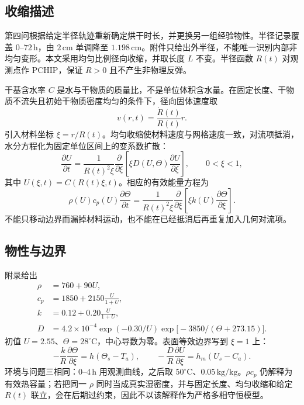 \subsection{收缩描述}

第四问根据给定半径轨迹重新确定烘干时长，并更换另一组经验物性。半径记录覆盖 $0$--$72\,\mathrm{h}$，由 $2\,\mathrm{cm}$ 单调降至 $1.198\,\mathrm{cm}$。附件只给出外半径，不能唯一识别内部非均匀变形。本文采用均匀比例径向收缩，并取长度 $L$ 不变。半径函数 $R(t)$ 对观测点作 PCHIP，保证 $R>0$ 且不产生非物理反弹。

干基含水率 $C$ 是水与干物质的质量比，不是单位体积含水量。在固定长度、干物质不流失且初始干物质密度均匀的条件下，径向固体速度取
\[
v(r,t)=\frac{\dot R(t)}{R(t)}r.
\]
引入材料坐标 $\xi=r/R(t)$。均匀收缩使材料速度与网格速度一致，对流项抵消，水分方程化为固定单位区间上的变系数扩散：
\begin{equation}
\frac{\partial U}{\partial t}
=\frac{1}{R(t)^2\xi}\frac{\partial}{\partial\xi}
\left[\xi D(U,\Theta)\frac{\partial U}{\partial\xi}\right],
\qquad 0<\xi<1,
\label{eq:q4-C}
\end{equation}
其中 $U(\xi,t)=C(R(t)\xi,t)$。相应的有效能量方程为
\begin{equation}
\rho(U)c_p(U)\frac{\partial\Theta}{\partial t}
=\frac{1}{R(t)^2\xi}\frac{\partial}{\partial\xi}
\left[\xi k(U)\frac{\partial\Theta}{\partial\xi}\right].
\label{eq:q4-T}
\end{equation}
不能只移动边界而漏掉材料运动，也不能在已经抵消后再重复加入几何对流项\cite{adrover2019}。

\subsection{物性与边界}

附录给出
\begin{equation}
\begin{aligned}
\rho&=760+90U,\\
c_p&=1850+2150\frac{U}{1+U},\\
k&=0.12+0.20\frac{U}{1+U},\\
D&=4.2\times10^{-4}\exp(-0.30/U)\exp\bigl[-3850/(\Theta+273.15)\bigr].
\end{aligned}
\label{eq:q4-prop}
\end{equation}
初值 $U=2.55$、$\Theta=28^\circ\mathrm{C}$，中心导数为零。表面等效边界写到 $\xi=1$ 上：
\[
-\frac{k}{R}\frac{\partial\Theta}{\partial\xi}=h(\Theta_s-T_a),\qquad
-\frac{D}{R}\frac{\partial U}{\partial\xi}=h_m(U_s-C_a).
\]
环境与问题三相同：$0$--$4\,\mathrm{h}$ 用观测曲线，之后取 $50^\circ\mathrm{C}$、$0.05\,\mathrm{kg/kg}$。$\rho c_p$ 仍解释为有效热容量；若把同一 $\rho$ 同时当成真实湿密度，并与固定长度、均匀收缩和给定 $R(t)$ 联立，会在后期过约束，因此不以该解释作为严格多相守恒模型。

